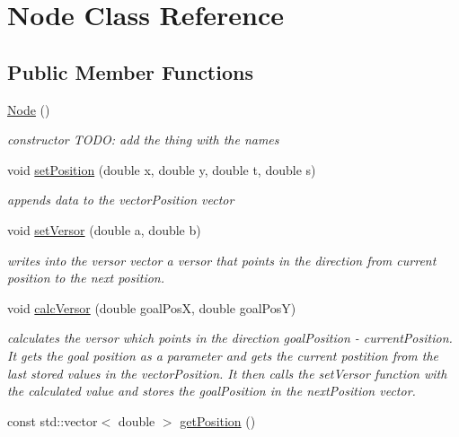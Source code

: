 \hypertarget{class_node}{\section{Node Class Reference}
\label{class_node}
}
\subsection*{Public Member Functions}
\begin{DoxyCompactItemize}
\item 
\hypertarget{class_node_ad7a34779cad45d997bfd6d3d8043c75f}{\hyperlink{class_node_ad7a34779cad45d997bfd6d3d8043c75f}{Node} ()}\label{class_node_ad7a34779cad45d997bfd6d3d8043c75f}

\begin{DoxyCompactList}\small\item\em constructor T\-O\-D\-O\-: add the thing with the names \end{DoxyCompactList}\item 
void \hyperlink{class_node_ae15a99b12ee9e6cb219a52051cdee090}{set\-Position} (double x, double y, double t, double s)
\begin{DoxyCompactList}\small\item\em appends data to the vector\-Position vector \end{DoxyCompactList}\item 
void \hyperlink{class_node_ada68112a882929b308ce62f0499913c1}{set\-Versor} (double a, double b)
\begin{DoxyCompactList}\small\item\em writes into the versor vector a versor that points in the direction from current position to the next position. \end{DoxyCompactList}\item 
void \hyperlink{class_node_a689845425deb2edf1201826ec6429f59}{calc\-Versor} (double goal\-Pos\-X, double goal\-Pos\-Y)
\begin{DoxyCompactList}\small\item\em calculates the versor which points in the direction goal\-Position -\/ current\-Position. It gets the goal position as a parameter and gets the current postition from the last stored values in the vector\-Position. It then calls the set\-Versor function with the calculated value and stores the goal\-Position in the next\-Position vector. \end{DoxyCompactList}\item 
const std\-::vector$<$ double $>$ \hyperlink{class_node_a7a63a9c380109553515be27fe088f4d7}{get\-Position} ()

\end{DoxyCompactItemize}
